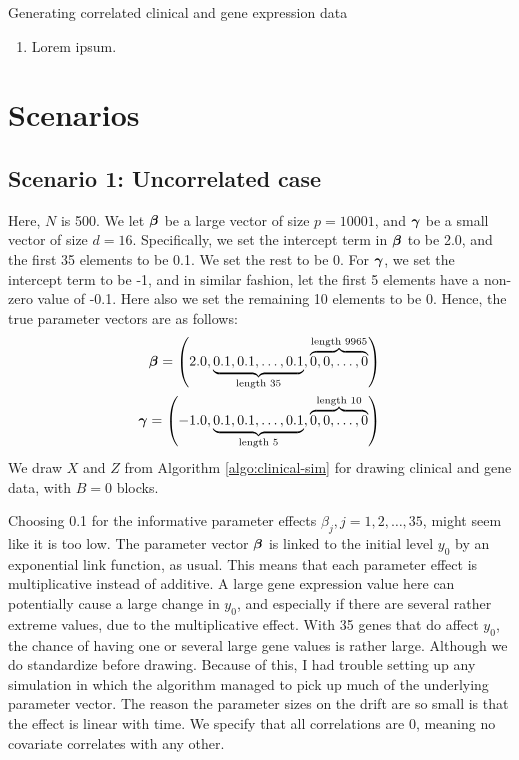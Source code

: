 \begin{algorithm}
\caption{Generating correlated clinical and gene expression data}
\label{algo:clinical-sim}
\begin{enumerate}
    \item Lorem ipsum.
\end{enumerate}
\end{algorithm}

\section{Scenarios}
\subsection{Scenario 1: Uncorrelated case}

Here, $N$ is 500. We let $\boldsymbol{\beta}$ be a large vector of size $p=10001$, and $\boldsymbol{\gamma}$ be a small vector of size $d=16$. Specifically, we set the intercept term in $\boldsymbol{\beta}$ to be 2.0, and the first 35 elements to be 0.1. We set the rest to be 0. For $\boldsymbol{\gamma}$, we set the intercept term to be -1, and in similar fashion, let the first 5 elements have a non-zero value of -0.1. Here also we set the remaining 10 elements to be 0.
Hence, the true parameter vectors are as follows:
\begin{align*}
    \boldsymbol{\beta}=\left(2.0, \underbrace{0.1, 0.1, \ldots, 0.1}_{\text{length 35}}, \overbrace{0, 0, \ldots, 0}^{\text{length 9965}}\right) \\
    \boldsymbol{\gamma}=\left(-1.0, \underbrace{0.1, 0.1, \ldots, 0.1}_{\text{length 5}}, \overbrace{0, 0, \ldots, 0}^{\text{length 10}}\right)
\end{align*}
We draw $X$ and $Z$ from Algorithm \ref{algo:clinical-sim} for drawing clinical and gene data, with $B=0$ blocks.

Choosing 0.1 for the informative parameter effects $\beta_j,j=1,2,\ldots,35$, might seem like it is too low.
The parameter vector $\boldsymbol{\beta}$ is linked to the initial level $y_0$ by an exponential link function, as usual.
This means that each parameter effect is multiplicative instead of additive.
A large gene expression value here can potentially cause a large change in $y_0$, and especially if there are several rather extreme values, due to the multiplicative effect.
With 35 genes that do affect $y_0$, the chance of having one or several large gene values is rather large.
Although we do standardize before drawing.
Because of this, I had trouble setting up any simulation in which the algorithm managed to pick up much of the underlying parameter vector.
The reason the parameter sizes on the drift are so small is that the effect is linear with time.
We specify that all correlations are 0, meaning no covariate correlates with any other.

